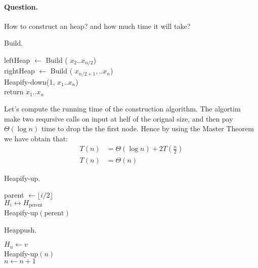 \paragraph{Question.} How to construct an heap? and how much time it will take?  

\begin{algbox}{Build.}
\begin{algorithm}[H]
{}
leftHeap $ \leftarrow $ Build ( $x_2 .. x_{n/2} $) \\ 
rightHeap $ \leftarrow $ Build ( $x_{n/2 +1 }, .. x_{n}$) \\
Heapify-down(1, $x_1 .. x_{n}$) \\
return $x_{1} .. x_{n}$
\end{algorithm}
\end{algbox}

Let's compute the running time of the construction algorithm. The algortim make two reqursive calls on input at helf of the orignal size, and then pay $\Theta\left( \log n \right)$ time to drop the the first node. Hence by using the Master Theorem we have obtain that: 
\begin{equation*}
  \begin{split}
    T\left( n \right) &= \Theta \left( \log n \right) + 2T\left( \frac{n}{2} \right) \\ 
    T\left( n \right) &= \Theta\left(  n  \right) 
  \end{split}
\end{equation*}

\begin{algbox}{Heapify-up.}
\begin{algorithm}[H]
{}
parent $\leftarrow \lfloor i/2 \rfloor $ \\
 { 
  $ H_{i} \leftrightarrow H_{\text{perent}} $ \\ 
  Heapify-up$\left( \text{perent}  \right)$
}
\end{algorithm}
\end{algbox}



\begin{algbox}{Heappush.}
\begin{algorithm}[H]
{}
$ H_{n} \leftarrow v $ \\ 
Heapify-up$\left( n \right)$\\
$ n \leftarrow n + 1 $ 
\end{algorithm}
\end{algbox}


